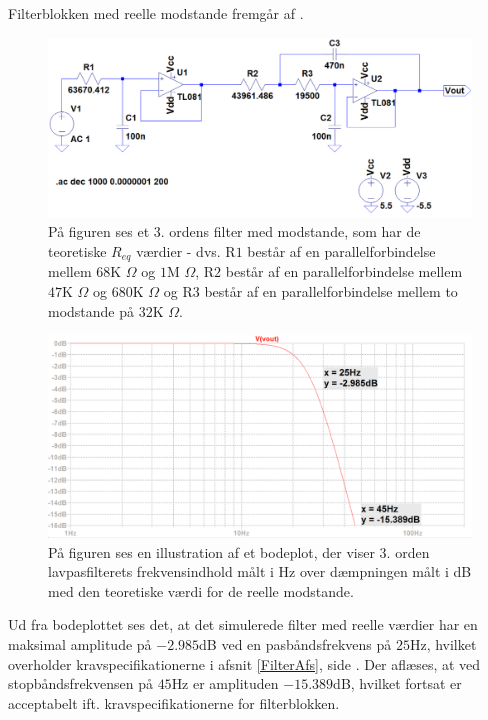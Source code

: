 \noindent Filterblokken med reelle modstande fremgår af .
\begin{figure}[H]
	\centering
	\includegraphics[scale=0.4]{figures/cProblemloesning/Sim_reel_modstande.PNG}
	\caption{På figuren ses et 3. ordens filter med modstande, som har de teoretiske $R_{eq}$ værdier - dvs. R$1$ består af en parallelforbindelse mellem $68$K $\Omega$ og $1$M $\Omega$, R$2$ består af en parallelforbindelse mellem $47$K $\Omega$ og $680$K $\Omega$ og R$3$ består af en parallelforbindelse mellem to modstande på $32$K $\Omega$.}
	\label{fig:Sim_reel_modstande}
\end{figure}

\begin{figure}[H]
	\centering
	\includegraphics[scale=0.35]{figures/cProblemloesning/Sim_reel_graf.PNG}
	\caption{På figuren ses en illustration af et bodeplot, der viser 3. orden lavpasfilterets frekvensindhold målt i Hz over dæmpningen målt i dB med den teoretiske værdi for de reelle modstande.}
	\label{fig:Sim_reel_graf}
\end{figure}

\noindent Ud fra bodeplottet ses det, at det simulerede filter med reelle værdier har en maksimal amplitude på $-2.985$dB ved en pasbåndsfrekvens på $25$Hz, hvilket overholder kravspecifikationerne i afsnit \ref{FilterAfs}, side \pageref{FilterAfs}. Der aflæses, at ved stopbåndsfrekvensen på $45$Hz er amplituden $-15.389$dB, hvilket fortsat er acceptabelt ift. kravspecifikationerne for filterblokken. 

